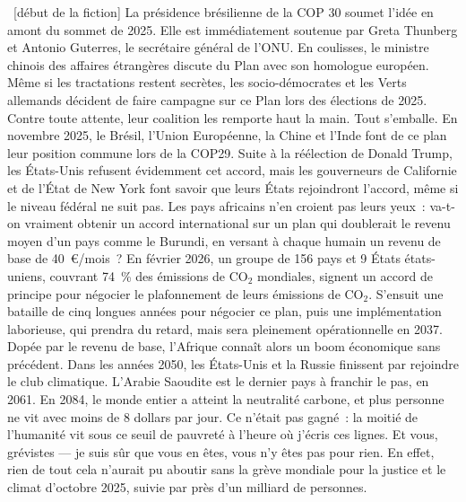 \documentclass[a5paper,french,openany]{memoir}
\begin{document}
~[début de la fiction] La présidence brésilienne de la COP 30 soumet l'idée en amont du sommet de 2025. Elle est immédiatement soutenue par Greta Thunberg et Antonio Guterres, le secrétaire général de l'ONU. 
En coulisses, le ministre chinois des affaires étrangères discute du Plan avec son homologue européen.  
Même si les tractations restent secrètes, les socio-démocrates et les Verts allemands décident de faire campagne sur ce Plan lors des élections de 2025. 
Contre toute attente, leur coalition les remporte haut la main. 
Tout s'emballe. En novembre 2025, le Brésil, l'Union Européenne, la Chine et l'Inde font de ce plan leur position commune lors de la COP29. Suite à la réélection de Donald Trump, les États-Unis refusent évidemment cet accord, mais les gouverneurs de Californie et de l'État de New York font savoir que leurs États rejoindront l'accord, même si le niveau fédéral ne suit pas. Les pays africains n'en croient pas leurs yeux~: 
va-t-on vraiment obtenir un accord international %
sur un plan qui doublerait le revenu moyen d'un pays comme le Burundi, en versant à chaque humain un revenu de base de 40~\euro{}/mois~? En février 2026, un groupe de 156 pays et 9 États états-uniens, couvrant 74~\% des émissions de CO$_\text{2}$ mondiales, signent un accord de principe pour négocier le plafonnement de leurs émissions de CO$_\text{2}$. S'ensuit une bataille de cinq longues années pour négocier ce plan, puis une implémentation laborieuse, qui prendra du retard, mais sera pleinement opérationnelle en 2037. Dopée par le revenu de base, l'Afrique connaît alors un boom économique sans précédent. Dans les années 2050, les États-Unis et la Russie finissent par rejoindre le club climatique. L'Arabie Saoudite est le dernier pays à franchir le pas, en 2061. En 2084, le monde entier a atteint la neutralité carbone, et plus personne ne vit avec moins de 8 dollars par jour. Ce n'était pas gagné~: la moitié de l'humanité vit sous ce seuil de pauvreté à l'heure où j'écris ces lignes. %
Et vous, grévistes --- je suis sûr que vous en êtes, vous n'y êtes pas pour rien. En effet, rien de tout cela n'aurait pu aboutir sans la grève mondiale pour la justice et le climat d'octobre 2025, suivie par près d'un milliard de personnes.
\end{document}
